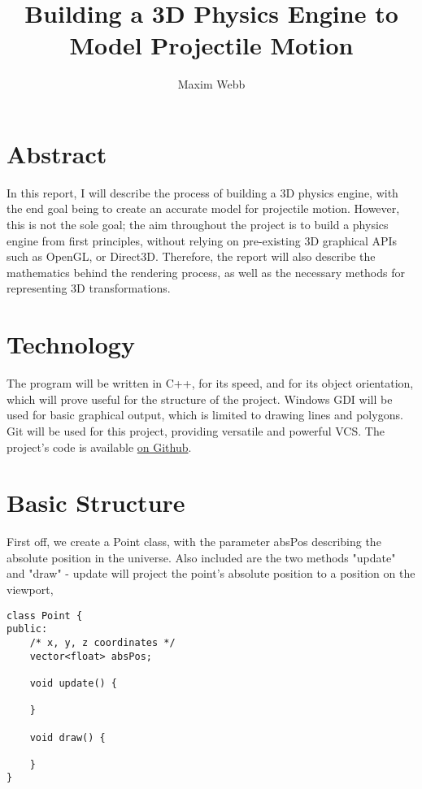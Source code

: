 \documentclass{article}
\title{
	\Huge
	{Building a 3D Physics Engine to Model Projectile Motion}\\
}
\author{Maxim Webb}
\begin{document}
\maketitle

\newpage

\section{Abstract}
In this report, I will describe the process of building a 3D physics engine, with the end goal being to create an accurate model for projectile motion.
\newline
\newline
However, this is not the sole goal; the aim throughout the project is to build a physics engine from first principles, without relying on pre-existing 3D graphical APIs such as OpenGL, or Direct3D. Therefore, the report will also describe the mathematics behind the rendering process, as well as the necessary methods for representing 3D transformations.
\newline

\section{Technology}
The program will be written in C++, for its speed, and for its object orientation, which will prove useful for the structure of the project.
\newline
\newline
Windows GDI will be used for basic graphical output, which is limited to drawing lines and polygons. 
\newline
\newline
Git will be used for this project, providing versatile and powerful VCS. The project's code is available 
\href{https://github.com/maximwebb/3D-engine}{\color{blue} on Github}\color{black}.
\newline
\newline

\newpage

\section{Basic Structure}

First off, we create a Point class, with the parameter absPos describing the absolute position in the universe. Also included are the two methods "update" and "draw" -  update will project the point's absolute position to a position on the viewport,
\newline
\begin{lstlisting}
class Point {
public:
	/* x, y, z coordinates */
	vector<float> absPos;
	
	void update() {
	
	}
	
	void draw() {
	
	}
}
\end{lstlisting}
\end{document}
